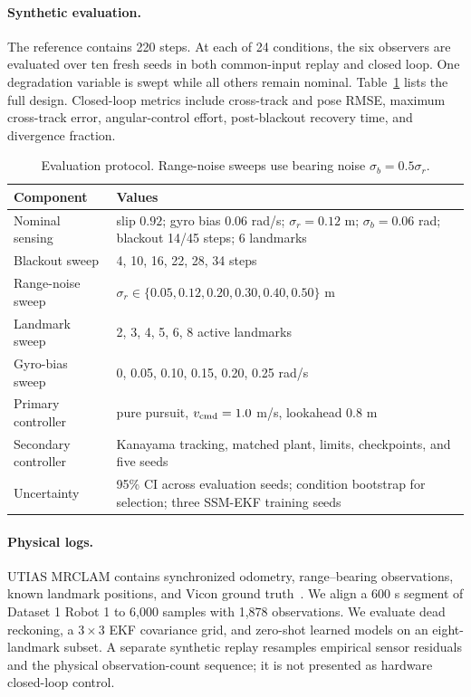 \documentclass{article}
\begin{document}
\paragraph{Synthetic evaluation.}
The reference contains 220 steps. At each of 24 conditions, the six observers are evaluated over ten fresh seeds in both common-input replay and closed loop. One degradation variable is swept while all others remain nominal. Table~\ref{tab:protocol} lists the full design. Closed-loop metrics include cross-track and pose RMSE, maximum cross-track error, angular-control effort, post-blackout recovery time, and divergence fraction.

\begin{table}[t]
\centering
\caption{Evaluation protocol. Range-noise sweeps use bearing noise $\sigma_b=0.5\sigma_r$.}
\label{tab:protocol}
\small
\begin{tabularx}{\linewidth}{lX}
\toprule
Component & Values\\
\midrule
Nominal sensing & slip $0.92$; gyro bias $0.06$ rad/s; $\sigma_r=0.12$ m; $\sigma_b=0.06$ rad; blackout 14/45 steps; 6 landmarks\\
Blackout sweep & 4, 10, 16, 22, 28, 34 steps\\
Range-noise sweep & $\sigma_r\in\{0.05,0.12,0.20,0.30,0.40,0.50\}$ m\\
Landmark sweep & 2, 3, 4, 5, 6, 8 active landmarks\\
Gyro-bias sweep & 0, 0.05, 0.10, 0.15, 0.20, 0.25 rad/s\\
Primary controller & pure pursuit, $v_{\rm cmd}=1.0$ m/s, lookahead $0.8$ m\\
Secondary controller & Kanayama tracking, matched plant, limits, checkpoints, and five seeds\\
Uncertainty & 95\% CI across evaluation seeds; condition bootstrap for selection; three SSM-EKF training seeds\\
\bottomrule
\end{tabularx}
\end{table}

\paragraph{Physical logs.}
UTIAS MRCLAM contains synchronized odometry, range--bearing observations, known landmark positions, and Vicon ground truth~\citep{leung2011utias}. We align a 600 s segment of Dataset 1 Robot 1 to 6,000 samples with 1,878 observations. We evaluate dead reckoning, a $3\times3$ EKF covariance grid, and zero-shot learned models on an eight-landmark subset. A separate synthetic replay resamples empirical sensor residuals and the physical observation-count sequence; it is not presented as hardware closed-loop control.
\end{document}
